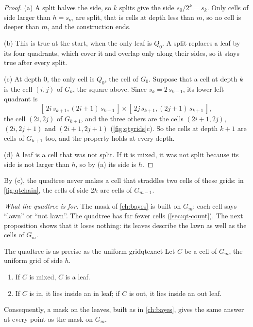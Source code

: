 \begin{proof}
(a) A split halves the side, so $k$ splits give the side $s_0/2^k=s_k$.
Only cells of side larger than $h=s_m$ are split, that is cells at depth
less than $m$, so no cell is deeper than $m$, and the construction ends.

(b) This is true at the start, when the only leaf is $Q_0$. A split
replaces a leaf by its four quadrants, which cover it and overlap only
along their sides, so it stays true after every split.

(c) At depth $0$, the only cell is $Q_0$, the cell of $G_0$. Suppose that
a cell at depth $k$ is the cell $(i,j)$ of $G_k$, the square above. Since
$s_k=2\,s_{k+1}$, its lower-left quadrant is
\[
  [\,2i\,s_{k+1},(2i+1)\,s_{k+1}\,]\times[\,2j\,s_{k+1},(2j+1)\,s_{k+1}\,],
\]
the cell $(2i,2j)$ of $G_{k+1}$, and the three others are the cells
$(2i+1,2j)$, $(2i,2j+1)$ and $(2i+1,2j+1)$ (\cref{fig:qtgrids}c). So the
cells at depth $k+1$ are cells of $G_{k+1}$ too, and the property holds
at every depth.

(d) A leaf is a cell that was not split. If it is mixed, it was not
split because its side is not larger than $h$, so by (a) its side is $h$.
\end{proof}

By (c), the quadtree never makes a cell that straddles two cells of these
grids: in \cref{fig:qtchain}, the cells of side $2h$ are cells of
$G_{m-1}$.

\emph{What the quadtree is for.} The mask of \cref{ch:bayes} is built on
$G_m$: each cell says ``lawn'' or ``not lawn''. The quadtree has far
fewer cells (\cref{sec:qt-count}). The next proposition shows that it
loses nothing: its leaves describe the lawn as well as the cells of
$G_m$.

\begin{proposition}{The quadtree is as precise as the uniform grid}{qtexact}
Let $C$ be a cell of $G_m$, the uniform grid of side $h$.
\begin{enumerate}[nosep,label=(\alph*)]
  \item If $C$ is mixed, $C$ is a leaf.
  \item If $C$ is in, it lies inside an in leaf; if $C$ is out, it lies
        inside an out leaf.
\end{enumerate}
Consequently, a mask on the leaves, built as in \cref{ch:bayes}, gives
the same answer at every point as the mask on $G_m$.
\end{proposition}

